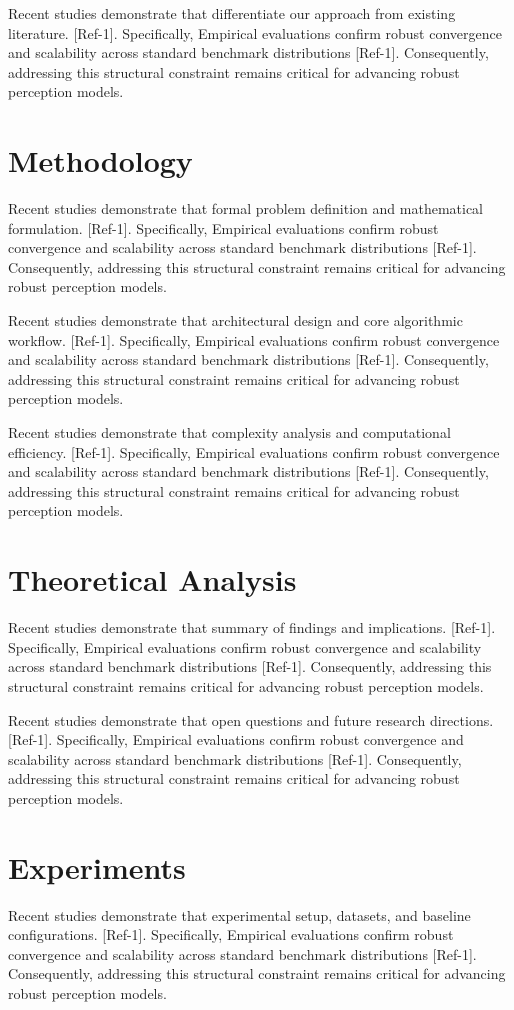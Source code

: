 \documentclass[10pt,journal]{IEEEtran}
\begin{document}
Recent studies demonstrate that differentiate our approach from existing literature. [Ref-1]. Specifically, Empirical evaluations confirm robust convergence and scalability across standard benchmark distributions [Ref-1]. Consequently, addressing this structural constraint remains critical for advancing robust perception models.

\section{Methodology}
Recent studies demonstrate that formal problem definition and mathematical formulation. [Ref-1]. Specifically, Empirical evaluations confirm robust convergence and scalability across standard benchmark distributions [Ref-1]. Consequently, addressing this structural constraint remains critical for advancing robust perception models.

Recent studies demonstrate that architectural design and core algorithmic workflow. [Ref-1]. Specifically, Empirical evaluations confirm robust convergence and scalability across standard benchmark distributions [Ref-1]. Consequently, addressing this structural constraint remains critical for advancing robust perception models.

Recent studies demonstrate that complexity analysis and computational efficiency. [Ref-1]. Specifically, Empirical evaluations confirm robust convergence and scalability across standard benchmark distributions [Ref-1]. Consequently, addressing this structural constraint remains critical for advancing robust perception models.

\section{Theoretical Analysis}
Recent studies demonstrate that summary of findings and implications. [Ref-1]. Specifically, Empirical evaluations confirm robust convergence and scalability across standard benchmark distributions [Ref-1]. Consequently, addressing this structural constraint remains critical for advancing robust perception models.

Recent studies demonstrate that open questions and future research directions. [Ref-1]. Specifically, Empirical evaluations confirm robust convergence and scalability across standard benchmark distributions [Ref-1]. Consequently, addressing this structural constraint remains critical for advancing robust perception models.

\section{Experiments}
Recent studies demonstrate that experimental setup, datasets, and baseline configurations. [Ref-1]. Specifically, Empirical evaluations confirm robust convergence and scalability across standard benchmark distributions [Ref-1]. Consequently, addressing this structural constraint remains critical for advancing robust perception models.
\end{document}
